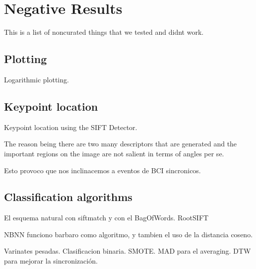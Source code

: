 \chapter{Negative Results}

This is a list of noncurated things that we tested and didnt work.

\section{Plotting}

Logarithmic plotting.

\section{Keypoint location}

Keypoint location using the SIFT Detector.

The reason being there are two many descriptors that are generated and the important regions on the image are not salient in terms of angles per se.

Esto provoco que nos inclinacemos a eventos de BCI sincronicos.


\section{Classification algorithms}

El esquema natural con siftmatch y con el BagOfWords.
RootSIFT

NBNN funciono barbaro como algoritmo, y tambien el uso de la distancia coseno.

Varinates pesadas.  Clasificacion binaria.  SMOTE.   MAD para el averaging.   DTW para mejorar la sincronización.


